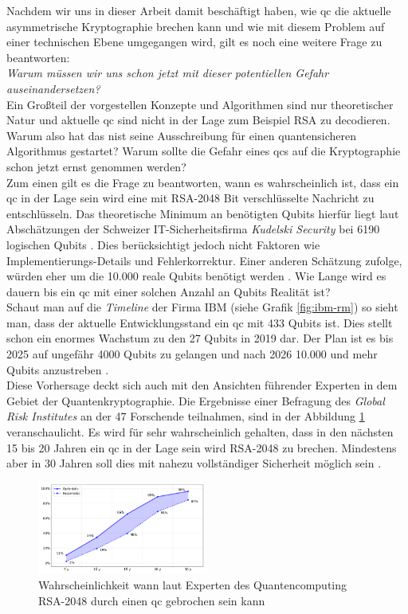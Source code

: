 Nachdem wir uns in dieser Arbeit damit beschäftigt haben, wie \ac{qc} die aktuelle asymmetrische Kryptographie brechen kann und wie mit diesem Problem auf einer technischen Ebene umgegangen wird, gilt es noch eine weitere Frage zu beantworten: \\
\textit{Warum müssen wir uns schon jetzt mit dieser potentiellen Gefahr auseinandersetzen?}\\
Ein Großteil der vorgestellen Konzepte und Algorithmen sind nur theoretischer Natur und aktuelle \ac{qc} sind nicht in der Lage zum Beispiel RSA zu decodieren. Warum also hat das \ac{nist} seine Ausschreibung für einen quantensicheren Algorithmus gestartet? Warum sollte die Gefahr eines \ac{qc}s auf die Kryptographie schon jetzt ernst genommen werden?\\
Zum einen gilt es die Frage zu beantworten, wann es wahrscheinlich ist, dass ein \ac{qc} in der Lage sein wird eine mit RSA-2048 Bit verschlüsselte Nachricht zu entschlüsseln. Das theoretische Minimum an benötigten Qubits hierfür liegt laut Abschätzungen der Schweizer IT-Sicherheitsfirma \textit{Kudelski Security} bei 6190 logischen Qubits \cite{gagliardoni_quantum_2021}. Dies berücksichtigt jedoch nicht Faktoren wie Implementierungs-Details und Fehlerkorrektur. Einer anderen Schätzung zufolge, würden eher um die 10.000 reale Qubits benötigt werden \cite{ziegler_online_2015}. Wie Lange wird es dauern bis ein \ac{qc} mit einer solchen Anzahl an Qubits Realität ist?\\
Schaut man auf die \textit{Timeline} der Firma IBM (siehe Grafik \ref{fig:ibm-rm}) so sieht man, dass der aktuelle Entwicklungsstand ein \ac{qc} mit 433 Qubits ist. Dies stellt schon ein enormes Wachstum zu den 27 Qubits in 2019 dar. Der Plan ist es bis 2025 auf ungefähr 4000 Qubits zu gelangen und nach 2026 10.000 und mehr Qubits anzustreben \cite{noauthor_ibm_2015}.\\
Diese Vorhersage deckt sich auch mit den Ansichten führender Experten in dem Gebiet der Quantenkryptographie. Die Ergebnisse einer Befragung des \textit{Global Risk Institutes} an der 47 Forschende teilnahmen, sind in der Abbildung \ref{fig:qx-approx} veranschaulicht. Es wird für sehr wahrscheinlich gehalten, dass in den nächsten 15 bis 20 Jahren ein \ac{qc} in der Lage sein wird RSA-2048 zu brechen. Mindestens aber in 30 Jahren soll dies mit nahezu vollständiger Sicherheit möglich sein \cite{noauthor_2021_nodate}.

\begin{figure}[!hbt]
    \centering
    \includegraphics[width=0.5\textwidth]{images/estiamte-qc.png}
    \caption{Wahrscheinlichkeit wann laut Experten des Quantencomputing RSA-2048 durch einen \ac{qc} gebrochen sein kann \cite{noauthor_2021_nodate}}
    \label{fig:qx-approx}
\end{figure}\